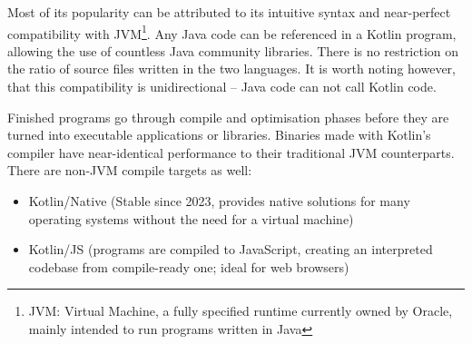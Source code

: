 Most of its popularity can be attributed to its intuitive syntax and near-perfect compatibility with JVM\footnote{JVM: \@Java Virtual Machine, a fully specified runtime currently owned by Oracle, mainly intended to run programs written in Java}. Any Java code can be referenced in a Kotlin program, allowing the use of countless Java community libraries. There is no restriction on the ratio of source files written in the two languages. It is worth noting however, that this compatibility is unidirectional -- Java code can not call Kotlin code.

Finished programs go through compile and optimisation phases before they are turned into executable applications or libraries. Binaries made with Kotlin's compiler have near-identical performance to their traditional JVM counterparts. There are non-JVM compile targets as well:
\begin{itemize}
    \item Kotlin/Native (Stable since 2023, provides native solutions for many operating systems without the need for a virtual machine)
    \item Kotlin/JS (programs are compiled to JavaScript, creating an interpreted codebase from compile-ready one; ideal for web browsers)
\end{itemize}

